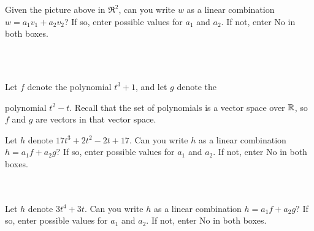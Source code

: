 \endedxproblem



\begin{center}
   
\end{center}

Given the picture above in $\Re^2$, 
can you write $w$ as a linear combination $w = a_1 v_1 + a_2 v_2$?  If so, enter possible values for $a_1$ and
$a_2$.  If not, enter No in both boxes.  


\\
\\



\edXsolution{ 
}

\endedxproblem



Let $f$ denote the polynomial $t^3  + 1$, and let $g$ denote the

polynomial $t^2 - t$.  Recall that the set of polynomials is a vector space over $\mathbb R$, so $f$ and $g$
are vectors in that vector space.  

Let $h$ denote $17t^3 + 2t^2 - 2t + 17$.
Can you write $h$  as a linear combination $h = a_1 f + a_2 g$?  If so, enter possible values for $a_1$ and
$a_2$.  If not, enter No in both boxes.  

\\
\\


Let $h$ denote $3t^4 + 3t$.
Can you write $h$  as a linear combination $h = a_1 f + a_2 g$?  If so, enter possible values for $a_1$ and
$a_2$.  If not, enter No in both boxes.  

\\
\\


\edXsolution{ 
}


